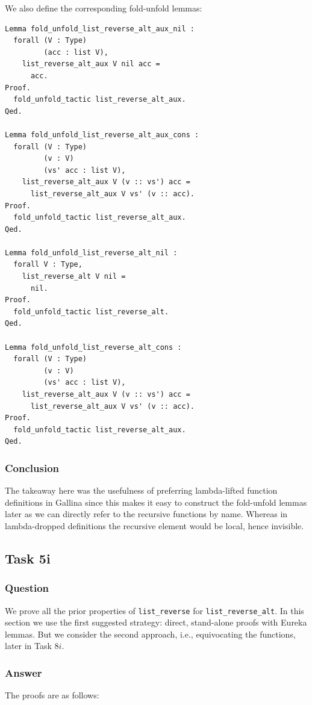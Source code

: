 \documentclass{article}
\begin{document}
We also define the corresponding fold-unfold lemmas:

\begin{lstlisting}
Lemma fold_unfold_list_reverse_alt_aux_nil :
  forall (V : Type)
         (acc : list V),
    list_reverse_alt_aux V nil acc =
      acc.
Proof.
  fold_unfold_tactic list_reverse_alt_aux.
Qed.

Lemma fold_unfold_list_reverse_alt_aux_cons :
  forall (V : Type)
         (v : V)
         (vs' acc : list V),
    list_reverse_alt_aux V (v :: vs') acc =
      list_reverse_alt_aux V vs' (v :: acc).
Proof.
  fold_unfold_tactic list_reverse_alt_aux.
Qed.

Lemma fold_unfold_list_reverse_alt_nil :
  forall V : Type,
    list_reverse_alt V nil =
      nil.
Proof.
  fold_unfold_tactic list_reverse_alt.
Qed.

Lemma fold_unfold_list_reverse_alt_cons :
  forall (V : Type)
         (v : V)
         (vs' acc : list V),
    list_reverse_alt_aux V (v :: vs') acc =
      list_reverse_alt_aux V vs' (v :: acc).
Proof.
  fold_unfold_tactic list_reverse_alt_aux.
Qed.
\end{lstlisting}
 
\subsubsection{Conclusion}
The takeaway here was the usefulness of preferring lambda-lifted function definitions in Gallina since this makes it easy to construct the fold-unfold lemmas later as we can directly refer to the recursive functions by name. Whereas in lambda-dropped definitions the recursive element would be local, hence invisible.

\subsection{Task 5i}

\subsubsection{Question}
We prove all the prior properties of \texttt{list\_reverse} for \texttt{list\_reverse\_alt}. In this section we use the first suggested strategy: direct, stand-alone proofs with Eureka lemmas. But we consider the second approach, i.e., equivocating the functions, later in Task $8i$.

\subsubsection{Answer}
The proofs are as follows:
\end{document}
